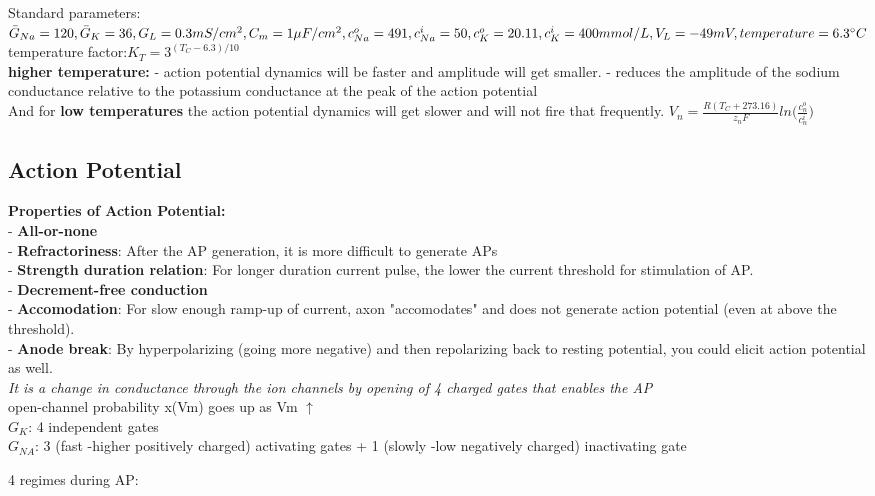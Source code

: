 \documentclass[9pt]{article}
\begin{document}
\begin{multicols}{2}
			Standard parameters:$\bar{G}_{Na}=120,\bar{G}_K=36, G_L=0.3mS/cm^2,\\C_m=1\mu F/cm^2,c_{Na}^o=491, c_{Na}^i=50,
			c_{K}^o=20.11,c_K^i=400 mmol/L, \\V_L=-49mV, temperature=6.3^\circ C$\\
		temperature factor:$K_T=3^{(T_C-6.3)/10}$\\
		\textbf{higher temperature: }- action potential dynamics will be faster and amplitude
        will get smaller. 
        - reduces the amplitude of the sodium conductance relative to
        the potassium conductance at the peak of the action potential\\
        And for \textbf{low temperatures} the action potential
dynamics will get slower and will not fire that frequently.
		$V_n=\frac{R(T_C+273.16)}{z_nF}ln\Big(\frac{c_n^o}{c_n^i}\Big)$
	
		
		
		\subsection{Action Potential}
		\textbf{Properties of Action Potential: }\\
- \textbf{All-or-none}\\
- \textbf{Refractoriness}: After the AP generation, it is more difficult to generate APs\\
- \textbf{Strength duration relation}: For longer duration current
pulse, the lower the current
threshold for stimulation of
AP.\\
- \textbf{Decrement-free conduction}\\
- \textbf{Accomodation}: For slow enough ramp-up of current, axon "accomodates" and does
not generate action potential (even at above the threshold).\\
-\textbf{ Anode break}: By hyperpolarizing (going more negative) and then repolarizing back to
resting potential, you could elicit action potential as well.\\
\textit{It is a change in conductance through the ion channels by opening of 4 charged gates that enables the AP}\\
open-channel probability x(Vm) goes up as Vm $\uparrow$\\
$G_K$: 4 independent gates\\
$G_{NA}$: 3 (fast -higher positively charged) activating gates + 1 (slowly -low negatively charged) inactivating gate

		4 regimes during AP:\\


\end{multicols}
\end{document}
